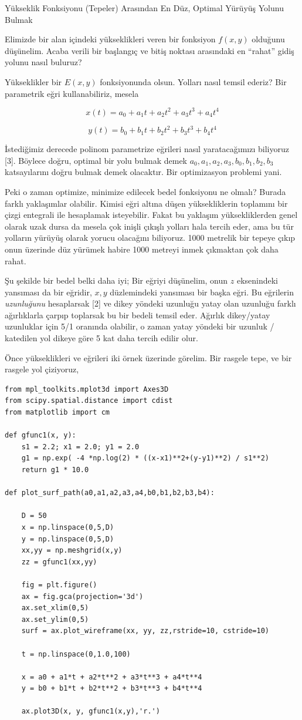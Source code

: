 \documentclass[12pt,fleqn]{article}\usepackage{../../common}
\begin{document}
Yükseklik Fonksiyonu (Tepeler) Arasından En Düz, Optimal Yürüyüş Yolunu Bulmak

Elimizde bir alan içindeki yükseklikleri veren bir fonksiyon $f(x,y)$
olduğunu düşünelim. Acaba verili bir başlangıç ve bitiş noktası arasındaki
en ``rahat'' gidiş yolunu nasıl buluruz? 

Yükseklikler bir $E(x,y)$ fonksiyonunda olsun. Yolları nasıl temsil ederiz?
Bir parametrik eğri kullanabiliriz, mesela 

$$
x(t) = a_0 + a_1 t + a_2 t^2 + a_3 t^3 + a_4 t^4
$$

$$
y(t) = b_0 + b_1 t + b_2 t^2 + b_3 t^3 + b_4 t^4
$$

İstediğimiz derecede polinom parametrize eğrileri nasıl yaratacağımızı
biliyoruz [3]. Böylece doğru, optimal bir yolu bulmak demek
$a_0,a_1,a_2,a_3,b_0,b_1,b_2,b_3$ katsayılarını doğru bulmak demek
olacaktır. Bir optimizasyon problemi yani.

Peki o zaman optimize, minimize edilecek bedel fonksiyonu ne olmalı? Burada
farklı yaklaşımlar olabilir. Kimisi eğri altına düşen yüksekliklerin
toplamını bir çizgi entegrali ile hesaplamak isteyebilir. Fakat bu yaklaşım
yüksekliklerden genel olarak uzak dursa da mesela çok inişli çıkışlı
yolları hala tercih eder, ama bu tür yolların yürüyüş olarak yorucu
olacağını biliyoruz. 1000 metrelik bir tepeye çıkıp onun üzerinde düz
yürümek habire 1000 metreyi inmek çıkmaktan çok daha rahat.

Şu şekilde bir bedel belki daha iyi; Bir eğriyi düşünelim, onun $z$
eksenindeki yansıması da bir eğridir, $x,y$ düzlemindeki yansıması bir
başka eğri. Bu eğrilerin {\em uzunluğunu} hesaplarsak [2] ve dikey yöndeki
uzunluğu yatay olan uzunluğu farklı ağırlıklarla çarpıp toplarsak bu bir
bedeli temsil eder. Ağırlık dikey/yatay uzunluklar için 5/1 oranında
olabilir, o zaman yatay yöndeki bir uzunluk / katedilen yol dikeye göre 5
kat daha tercih edilir olur.

Önce yükseklikleri ve eğrileri iki örnek üzerinde görelim. Bir rasgele
tepe, ve bir rasgele yol çiziyoruz,

\begin{verbatim}
from mpl_toolkits.mplot3d import Axes3D
from scipy.spatial.distance import cdist
from matplotlib import cm

def gfunc1(x, y):
    s1 = 2.2; x1 = 2.0; y1 = 2.0
    g1 = np.exp( -4 *np.log(2) * ((x-x1)**2+(y-y1)**2) / s1**2)
    return g1 * 10.0

def plot_surf_path(a0,a1,a2,a3,a4,b0,b1,b2,b3,b4):

    D = 50
    x = np.linspace(0,5,D)
    y = np.linspace(0,5,D)
    xx,yy = np.meshgrid(x,y)
    zz = gfunc1(xx,yy)

    fig = plt.figure()
    ax = fig.gca(projection='3d')
    ax.set_xlim(0,5)
    ax.set_ylim(0,5)
    surf = ax.plot_wireframe(xx, yy, zz,rstride=10, cstride=10)

    t = np.linspace(0,1.0,100)

    x = a0 + a1*t + a2*t**2 + a3*t**3 + a4*t**4 
    y = b0 + b1*t + b2*t**2 + b3*t**3 + b4*t**4

    ax.plot3D(x, y, gfunc1(x,y),'r.')
\end{verbatim}
\end{document}
